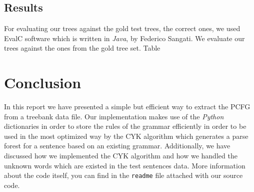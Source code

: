 \documentclass[a4paper,11pt]{article}
\begin{document}
\subsection{Results}
For evaluating our trees against the gold test trees, the correct ones, we used EvalC software which is written in \textit{Java}, by Federico Sangati. We evaluate our trees against the ones from the gold tree set. Table~\re

\section{Conclusion}
\label{concl}
In this report we have presented a simple but efficient way to extract the PCFG from a
treebank data file. Our implementation makes use of the \textit{Python} dictionaries in order to store the rules of the grammar efficiently in order to be used in the most optimized way by the CYK algorithm which generates a parse forest for a sentence based on an existing grammar.
 Additionally, we have discussed how we implemented the CYK algorithm and how we handled the unknown words which are existed in the test sentences data. More information about the code itself, you can find in the \texttt{readme} file attached with our source code.
\end{document}
